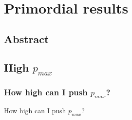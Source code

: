 \chapter{Primordial results}
\section{Abstract}\label{sec:primordial_abstract}
\section{High $p_{max}$}\label{sec:high_pmax}
\subsection{How high can I push $p_{max}$?}
How high can I push $p_{max}$?

